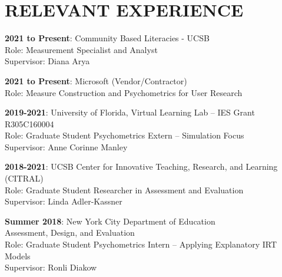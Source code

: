 \documentclass[12pt, oneside,]{memoir}
\begin{document}
\hypertarget{relevant-experience}{%
\section{RELEVANT EXPERIENCE}\label{relevant-experience}}
\begin{hangparas}{.25in}{1}

\noindent \textbf{2021 to Present}: Community Based Literacies - UCSB\\
\hspace*{0.333em}\hspace*{0.333em} Role: Measurement Specialist and Analyst\\
\hspace*{0.333em}\hspace*{0.333em} Supervisor: Diana Arya

\noindent \textbf{2021 to Present}: Microsoft (Vendor/Contractor)\\
\hspace*{0.333em}\hspace*{0.333em} Role: Measure Construction and Psychometrics for User Research

\noindent \textbf{2019-2021}: University of Florida, Virtual Learning Lab -- IES Grant R305C160004\\
\hspace*{0.333em}\hspace*{0.333em} Role: Graduate Student Psychometrics Extern -- Simulation Focus\\
\hspace*{0.333em}\hspace*{0.333em} Supervisor: Anne Corinne Manley

\noindent \textbf{2018-2021}: UCSB Center for Innovative Teaching, Research, and Learning
(CITRAL)\\
\hspace*{0.333em}\hspace*{0.333em}Role: Graduate Student Researcher in
Assessment and Evaluation\\
\hspace*{0.333em}\hspace*{0.333em}Supervisor: Linda Adler-Kassner

\noindent \textbf{Summer 2018}: New York City Department of Education\\
Assessment, Design, and Evaluation\\
\hspace*{0.333em}\hspace*{0.333em}Role: Graduate Student Psychometrics
Intern -- Applying Explanatory IRT Models\\
\hspace*{0.333em}\hspace*{0.333em}Supervisor: Ronli Diakow


\end{hangparas}
\end{document}
